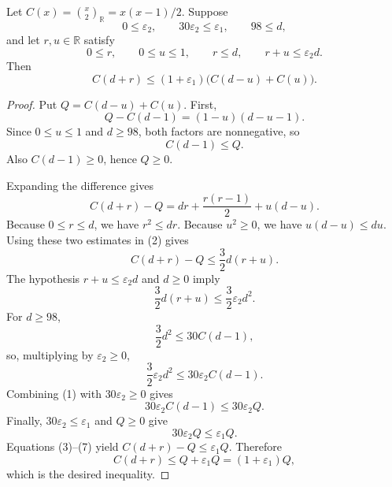 \begin{helper}
Let \(C(x)=\binom{x}{2}_{\mathbb R}=x(x-1)/2\).  Suppose
\[
0\le \varepsilon_2,\qquad 30\varepsilon_2\le \varepsilon_1,\qquad
98\le d,
\]
and let \(r,u\in\mathbb R\) satisfy
\[
0\le r,\qquad 0\le u\le1,\qquad r\le d,\qquad
r+u\le \varepsilon_2 d.
\]
Then
\[
C(d+r)\le
(1+\varepsilon_1)\bigl(C(d-u)+C(u)\bigr).
\]
\end{helper}
\begin{proof}
Put \(Q=C(d-u)+C(u)\).  First,
\[
Q-C(d-1)=(1-u)(d-u-1).
\]
Since \(0\le u\le1\) and \(d\ge98\), both factors are nonnegative, so
\[
C(d-1)\le Q. \tag{1}
\]
Also \(C(d-1)\ge0\), hence \(Q\ge0\).

Expanding the difference gives
\[
C(d+r)-Q=dr+\frac{r(r-1)}2+u(d-u). \tag{2}
\]
Because \(0\le r\le d\), we have \(r^2\le dr\).  Because \(u^2\ge0\),
we have \(u(d-u)\le du\).  Using these two estimates in (2) gives
\[
C(d+r)-Q\le \frac32 d(r+u). \tag{3}
\]
The hypothesis \(r+u\le\varepsilon_2d\) and \(d\ge0\) imply
\[
\frac32 d(r+u)\le \frac32\varepsilon_2d^2. \tag{4}
\]
For \(d\ge98\),
\[
\frac32d^2\le30C(d-1),
\]
so, multiplying by \(\varepsilon_2\ge0\),
\[
\frac32\varepsilon_2d^2\le30\varepsilon_2C(d-1). \tag{5}
\]
Combining (1) with \(30\varepsilon_2\ge0\) gives
\[
30\varepsilon_2C(d-1)\le30\varepsilon_2Q. \tag{6}
\]
Finally, \(30\varepsilon_2\le\varepsilon_1\) and \(Q\ge0\) give
\[
30\varepsilon_2Q\le\varepsilon_1Q. \tag{7}
\]
Equations (3)--(7) yield \(C(d+r)-Q\le\varepsilon_1Q\).  Therefore
\[
C(d+r)\le Q+\varepsilon_1Q=(1+\varepsilon_1)Q,
\]
which is the desired inequality.
\end{proof}
